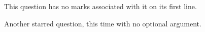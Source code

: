 \documentclass{outn}
\begin{document}
This question has no marks associated with it on its first line.

\question*
Another starred question, this time with no optional argument.



\end{document}
